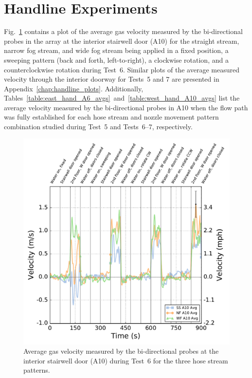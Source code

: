 \documentclass[12pt,oneside]{book}
\begin{document}
\section{Handline Experiments}
\label{sec:handline_results}
Fig.~\ref{fig:Test_6_BDP_A10_Avg_All} contains a plot of the average gas velocity measured by the bi-directional probes in the array at the interior stairwell door (A10) for the straight stream, narrow fog stream, and wide fog stream being applied in a fixed position, a sweeping pattern (back and forth, left-to-right), a clockwise rotation, and a counterclockwise rotation during Test~6. Similar plots of the average measured velocity through the interior doorway for Tests~5 and 7 are presented in Appendix~\ref{chap:handline_plots}. Additionally, Tables~\ref{table:east_hand_A6_avgs}~and~\ref{table:west_hand_A10_avgs} list the average velocity measured by the bi-directional probes in A10 when the flow path was fully established for each hose stream and nozzle movement pattern combination studied during Test~5 and Tests~6--7, respectively.

\begin{figure}[!ht]
	\includegraphics[width=\columnwidth]{../Figures/Plots/Test_18_West_063014_BDP_A10_stream_avgs}
	\caption[Average gas velocity through the interior stairwell door during Test~6 for the three hose stream patterns.]{Average gas velocity measured by the bi-directional probes at the interior stairwell door (A10) during Test~6 for the three hose stream patterns.}
	\label{fig:Test_6_BDP_A10_Avg_All}
\end{figure}
\FloatBarrier
\end{document}
